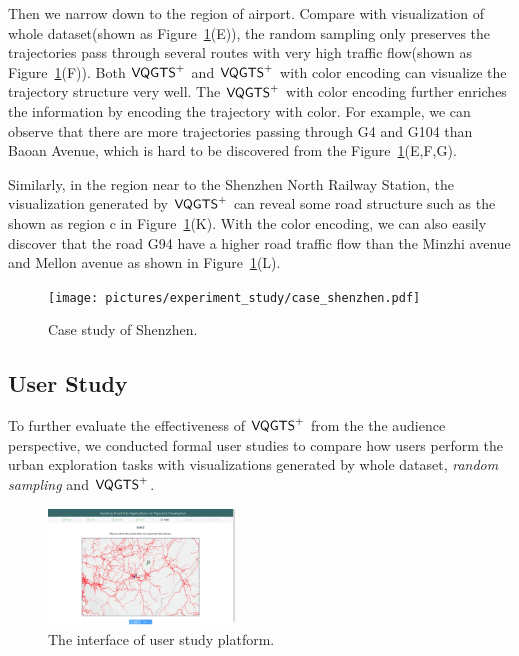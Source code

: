 Then we narrow down to the region of airport. Compare with visualization of whole dataset(shown as Figure~\ref{fig:shenzhen}(E)), the random sampling only preserves the trajectories pass through several routes with very high traffic flow(shown as Figure~\ref{fig:shenzhen}(F)).  Both $\mathsf{VQGTS}^{+}$ and $\mathsf{VQGTS}^{+}$ with color encoding can visualize the trajectory structure very well. The $\mathsf{VQGTS}^{+}$ with color encoding further enriches the information by encoding the trajectory with color. For example, we can observe that there are more trajectories passing through G4 and G104 than Baoan Avenue, which is hard to be discovered from the Figure~\ref{fig:shenzhen}(E,F,G).  

Similarly, in the region near to the Shenzhen North Railway Station, the visualization generated by $\mathsf{VQGTS}^{+}$ can reveal some road structure such as the  shown as region c in Figure~\ref{fig:shenzhen}(K). With the color encoding, we can also easily discover that the road G94 have a higher road traffic flow than the Minzhi avenue and Mellon avenue as shown in Figure~\ref{fig:shenzhen}(L).

\begin{figure}[t]
	\centering
	\vspace{2mm}
	\texttt{[image: pictures/experiment\_study/case\_shenzhen.pdf]}
	\caption{Case study of Shenzhen.}
	\vspace{0mm}
	\label{fig:shenzhen}
\end{figure}


\subsection{User Study}
To further evaluate the effectiveness of $\mathsf{VQGTS}^{+}$ from the the audience perspective, we conducted formal user studies to compare how users perform the urban exploration tasks with visualizations generated by whole dataset, \textit{random sampling} and $\mathsf{VQGTS}^{+}$.


\begin{figure}[t]
	\centering
	\includegraphics[width=0.44\textwidth]{pictures/user_study/interface.jpg}
	\vspace{-3mm}
	\caption{The interface of user study platform.}
	\vspace{-5mm}
	\label{fig:user_study}
\end{figure}

